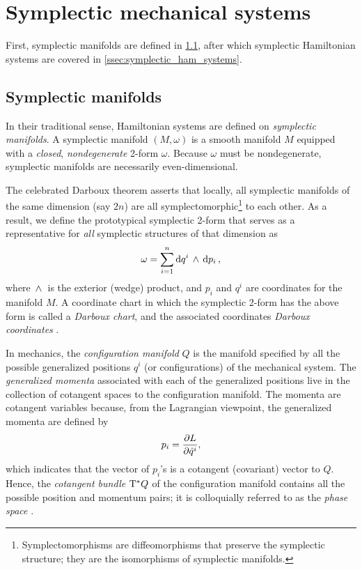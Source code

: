 \section{Symplectic mechanical systems}
\label{sec:symplectic}

First, symplectic manifolds are defined in \cref{ssec:symplectic_manifolds}, after which symplectic Hamiltonian systems are covered in \cref{ssec:symplectic_ham_systems}.

\subsection{Symplectic manifolds}
\label{ssec:symplectic_manifolds}
In their traditional sense, Hamiltonian systems are defined on \emph{symplectic manifolds}. A symplectic manifold \((M, \omega)\) is a smooth manifold \(M\) equipped with a \emph{closed}, \emph{nondegenerate} 2-form \(\omega\). Because \(\omega\) must be nondegenerate, symplectic manifolds are necessarily even-dimensional. 

The celebrated Darboux theorem asserts that locally, all symplectic manifolds of the same dimension (say \(2n\)) are all symplectomorphic\footnote{Symplectomorphisms are diffeomorphisms that preserve the symplectic structure; they are the isomorphisms of symplectic manifolds.} to each other. As a result, we define the prototypical symplectic 2-form that serves as a representative for \emph{all} symplectic structures of that dimension as
\begin{equation}
    \omega = \sum_{i = 1}^n  \dd{q^i}\,\wedge\,\dd{p_i} ,
    \label{eq:darboux_symplectic_form}
\end{equation}
where $ \,\wedge\, $ is the exterior (wedge) product, and \(p_i\) and \(q^i\) are coordinates for the manifold \(M\). A coordinate chart in which the symplectic 2-form has the above form is called a \emph{Darboux chart}, and the associated coordinates \emph{Darboux coordinates} \cite{Cannas2001, Arnold1989}.

In mechanics, the \emph{configuration manifold} \(Q\) is the manifold specified by all the possible generalized positions \(q^i\) (or configurations) of the mechanical system. The \emph{generalized momenta} associated with each of the generalized positions live in the collection of cotangent spaces to the configuration manifold. The momenta are cotangent variables because, from the Lagrangian viewpoint, the generalized momenta are defined by
\begin{equation}
     p_i = \pdv{L}{\dot{q}^i},
\end{equation}
which indicates that the vector of \(p_i\)'s is a cotangent (covariant) vector to \(Q\). Hence, the \emph{cotangent bundle} $\mathrm{T}^*Q$ of the configuration manifold contains all the possible position and momentum pairs; it is colloquially referred to as the \emph{phase space} \cite{Abraham1978,Arnold1989,Libermann1987}.


